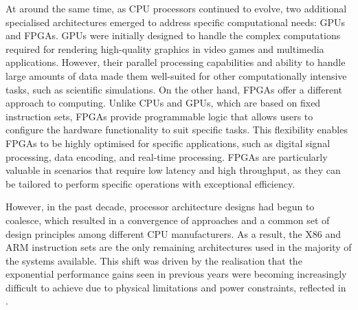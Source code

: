 At around the same time, as CPU processors continued to evolve, two additional specialised architectures emerged to address specific computational needs: GPUs and FPGAs. GPUs were initially designed to handle the complex computations required for rendering high-quality graphics in video games and multimedia applications. However, their parallel processing capabilities and ability to handle large amounts of data made them well-suited for other computationally intensive tasks, such as scientific simulations. On the other hand, FPGAs offer a different approach to computing. Unlike CPUs and GPUs, which are based on fixed instruction sets, FPGAs provide programmable logic that allows users to configure the hardware functionality to suit specific tasks. This flexibility enables FPGAs to be highly optimised for specific applications, such as digital signal processing, data encoding, and real-time processing. FPGAs are particularly valuable in scenarios that require low latency and high throughput, as they can be tailored to perform specific operations with exceptional efficiency.

However, in the past decade, processor architecture designs had begun to coalesce, which resulted in a convergence of approaches and a common set of design principles among different CPU manufacturers. As a result, the X86 and ARM instruction sets are the only remaining architectures used in the majority of the systems available. This shift was driven by the realisation that the exponential performance gains seen in previous years were becoming increasingly difficult to achieve due to physical limitations and power constraints, reflected in .


